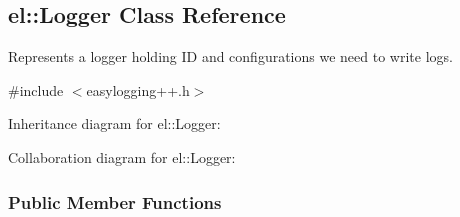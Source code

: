 \hypertarget{a00048}{}\subsection{el\+:\+:Logger Class Reference}
\label{a00048}


Represents a logger holding I\+D and configurations we need to write logs.  




{\ttfamily \#include $<$easylogging++.\+h$>$}



Inheritance diagram for el\+:\+:Logger\+:


Collaboration diagram for el\+:\+:Logger\+:
\subsubsection*{Public Member Functions}
